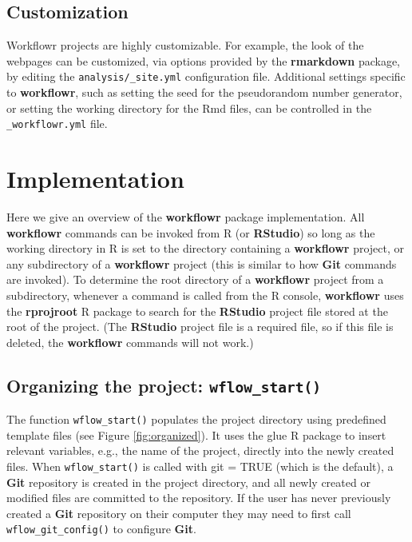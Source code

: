 \documentclass[9pt,a4paper]{extarticle}
\begin{document}
\subsection*{Customization}

Workflowr projects are highly customizable. For example, the look of the
webpages can be customized, via options provided by the \textbf{rmarkdown}
package, by editing the \verb|analysis/_site.yml| configuration file.
Additional settings specific to \textbf{workflowr}, such as setting the seed for
the pseudorandom number generator, or setting the working directory for
the Rmd files, can be controlled in the \verb|_workflowr.yml| file.


\section*{Implementation}

Here we give an overview of the \textbf{workflowr} package implementation. All \textbf{workflowr} commands can be invoked from R (or \textbf{RStudio}) so long as the working directory in R is set to the directory containing a \textbf{workflowr} project, or any subdirectory of a \textbf{workflowr} project (this is similar to how \textbf{Git} commands are invoked). To determine the root directory of a \textbf{workflowr} project from a subdirectory, whenever a command is called from the R console, \textbf{workflowr} uses the \textbf{rprojroot} \cite{rprojroot} R package to search for the \textbf{RStudio} project file stored at the root of the project. (The \textbf{RStudio} project file is a required file, so if this file is deleted, the \textbf{workflowr} commands will not work.)

\subsection*{Organizing the project: \texttt{wflow\_start()}}

The function \texttt{wflow\_start()} populates the project directory using
predefined template files (see Figure \ref{fig:organized}). It uses the glue R package to
insert relevant variables, e.g., the name of the project, directly into
the newly created files. When \texttt{wflow\_start()} is called with git = TRUE
(which is the default), a \textbf{Git} repository is created in the project
directory, and all newly created or modified files are committed to the
repository. If the user has never previously created a \textbf{Git} repository on
their computer they may need to first call \texttt{wflow\_git\_config()} to
configure \textbf{Git}.
\end{document}
